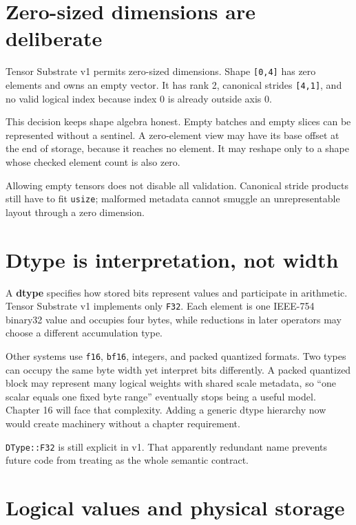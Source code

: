 \section{Zero-sized dimensions are
deliberate}\label{zero-sized-dimensions-are-deliberate}

Tensor Substrate v1 permits zero-sized dimensions. Shape
\texttt{{[}0,4{]}} has zero elements and owns an empty vector. It has
rank 2, canonical strides \texttt{{[}4,1{]}}, and no valid logical index
because index 0 is already outside axis 0.

This decision keeps shape algebra honest. Empty batches and empty slices
can be represented without a sentinel. A zero-element view may have its
base offset at the end of storage, because it reaches no element. It may
reshape only to a shape whose checked element count is also zero.

Allowing empty tensors does not disable all validation. Canonical stride
products still have to fit \texttt{usize}; malformed metadata cannot
smuggle an unrepresentable layout through a zero dimension.

\section{Dtype is interpretation, not
width}\label{dtype-is-interpretation-not-width}

A \textbf{dtype} specifies how stored bits represent values and
participate in arithmetic. Tensor Substrate v1 implements only
\texttt{F32}. Each element is one IEEE-754 binary32 value and occupies
four bytes, while reductions in later operators may choose a different
accumulation type.

Other systems use \texttt{f16}, \texttt{bf16}, integers, and packed
quantized formats. Two types can occupy the same byte width yet
interpret bits differently. A packed quantized block may represent many
logical weights with shared scale metadata, so ``one scalar equals one
fixed byte range'' eventually stops being a useful model. Chapter 16
will face that complexity. Adding a generic dtype hierarchy now would
create machinery without a chapter requirement.

\texttt{DType::F32} is still explicit in v1. That apparently redundant
name prevents future code from treating
\texttt{} as the whole semantic contract.

\section{Logical values and physical
storage}\label{logical-values-and-physical-storage}

